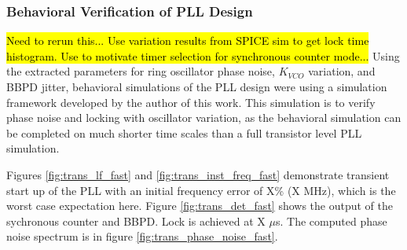 \FloatBarrier






		\subsubsection{Behavioral Verification of PLL Design}
		\hl{Need to rerun this... Use variation results from SPICE sim to get lock time histogram. Use to motivate timer selection for synchronous counter mode...}
		Using the extracted parameters for ring oscillator phase noise, $K_{VCO}$ variation, and BBPD jitter, behavioral simulations of the PLL design were using a simulation framework \cite{Me} developed by the author of this work. This simulation is to verify phase noise and locking with oscillator variation, as the behavioral simulation can be completed on much shorter time scales than a full transistor level PLL simulation.

		Figures \ref{fig:trans_lf_fast} and \ref{fig:trans_inst_freq_fast} demonstrate transient start up of the PLL with an initial frequency error of X\% (X MHz), which is the worst case expectation here. Figure \ref{fig:trans_det_fast} shows the output of the sychronous counter and BBPD. Lock is achieved at X $\mu$s. The computed phase noise spectrum is in figure \ref{fig:trans_phase_noise_fast}.

